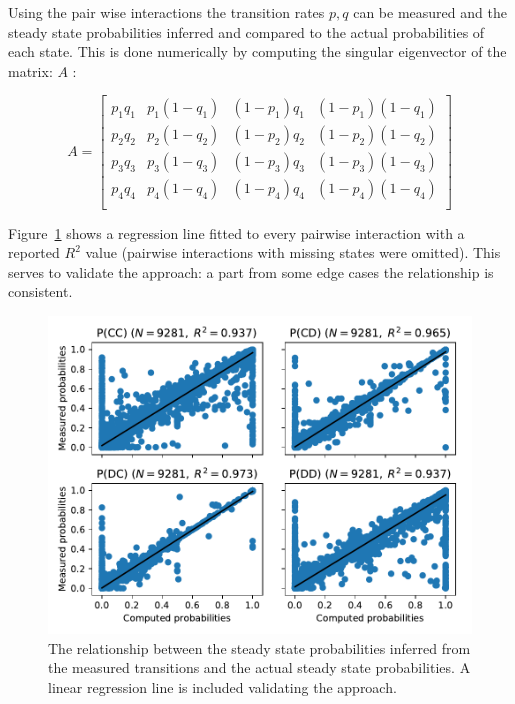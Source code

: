 \documentclass[a4paper]{article}
\begin{document}
Using the pair wise interactions the transition rates \(p,
q\) can be measured and the steady state probabilities inferred and compared to
the actual probabilities of each state.
This is done numerically by computing the singular eigenvector of the
matrix: \(A\) \cite{Stewart2009}:

\[
    A =
    \begin{bmatrix}
        p_1 q_1 & p_1 (1 - q_1) & (1 - p_1) q_1 & (1 -p_1) (1 - q_1) \\
        p_2 q_2 & p_2 (1 - q_2) & (1 - p_2) q_2 & (1 -p_2) (1 - q_2) \\
        p_3 q_3 & p_3 (1 - q_3) & (1 - p_3) q_3 & (1 -p_3) (1 - q_3) \\
        p_4 q_4 & p_4 (1 - q_4) & (1 - p_4) q_4 & (1 -p_4) (1 - q_4) \\
    \end{bmatrix}
\]

Figure~\ref{fig:computed_probabilities_vs_theoretic_probabilities}
shows a regression line fitted to every pairwise interaction with a reported
\(R^2\) value (pairwise interactions with missing states were omitted). This
serves to validate the approach: a part from some edge cases the relationship is
consistent.

\begin{figure}[!htbp]
    \centering
    \includegraphics[width=.8\textwidth]{./assets/img/computed_probabilities_vs_theoretic_probabilities/main.pdf}
    \caption{The
        relationship between the steady state probabilities inferred from the
        measured transitions and the actual steady state probabilities. A linear
        regression line is included validating the approach.}
    \label{fig:computed_probabilities_vs_theoretic_probabilities}
\end{figure}
\end{document}
